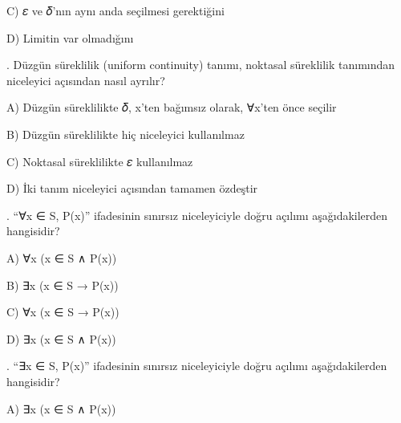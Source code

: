 \par\noindent\hspace*{1.6em}C) 𝜀 ve 𝛿’nın aynı anda seçilmesi gerektiğini

\par\noindent\hspace*{1.6em}D) Limitin var olmadığını

\par\smallskip{}. Düzgün süreklilik (uniform continuity) tanımı, noktasal süreklilik tanımından niceleyici açısından nasıl ayrılır?

\par\noindent\hspace*{1.6em}A) Düzgün süreklilikte 𝛿, x’ten bağımsız olarak, ∀x’ten önce seçilir

\par\noindent\hspace*{1.6em}B) Düzgün süreklilikte hiç niceleyici kullanılmaz

\par\noindent\hspace*{1.6em}C) Noktasal süreklilikte 𝜀 kullanılmaz

\par\noindent\hspace*{1.6em}D) İki tanım niceleyici açısından tamamen özdeştir

\par\smallskip{}. “∀x ∈ S, P(x)” ifadesinin sınırsız niceleyiciyle doğru açılımı aşağıdakilerden hangisidir?

\par\noindent\hspace*{1.6em}A) ∀x (x ∈ S ∧ P(x))

\par\noindent\hspace*{1.6em}B) ∃x (x ∈ S → P(x))

\par\noindent\hspace*{1.6em}C) ∀x (x ∈ S → P(x))

\par\noindent\hspace*{1.6em}D) ∃x (x ∈ S ∧ P(x))

\par\smallskip{}. “∃x ∈ S, P(x)” ifadesinin sınırsız niceleyiciyle doğru açılımı aşağıdakilerden hangisidir?

\par\noindent\hspace*{1.6em}A) ∃x (x ∈ S ∧ P(x))

